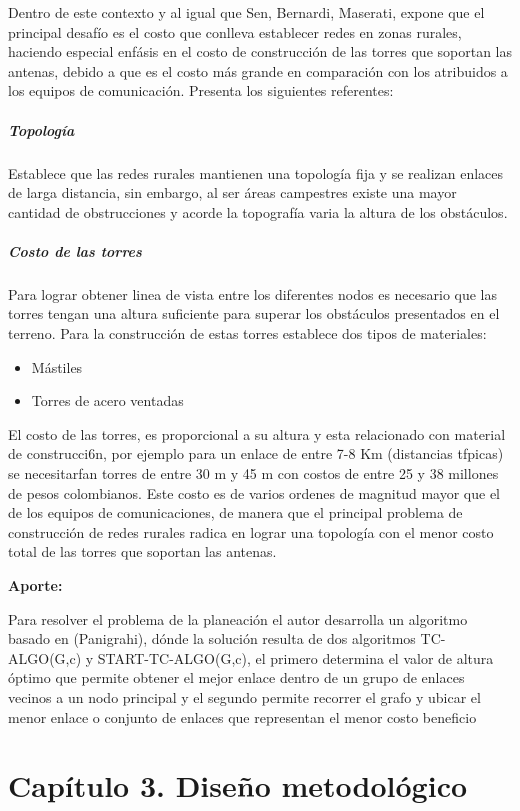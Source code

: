 \documentclass[]{article}
\providecommand{\tightlist}{%
  \setlength{\itemsep}{0pt}\setlength{\parskip}{0pt}}
\let\oldsubparagraph\subparagraph
\renewcommand{\subparagraph}[1]{\oldsubparagraph{#1}\mbox{}}
\begin{document}
Dentro de este contexto y al igual que Sen, Bernardi, Maserati, expone
que el principal desafío es el costo que conlleva establecer redes en
zonas rurales, haciendo especial enfásis en el costo de construcción de
las torres que soportan las antenas, debido a que es el costo más grande
en comparación con los atribuidos a los equipos de comunicación.
Presenta los siguientes referentes:

\subparagraph{Topología}\label{topologuxeda}

Establece que las redes rurales mantienen una topología fija y se
realizan enlaces de larga distancia, sin embargo, al ser áreas
campestres existe una mayor cantidad de obstrucciones y acorde la
topografía varia la altura de los obstáculos.

\subparagraph{Costo de las torres}\label{costo-de-las-torres}

Para lograr obtener linea de vista entre los diferentes nodos es
necesario que las torres tengan una altura suficiente para superar los
obstáculos presentados en el terreno. Para la construcción de estas
torres establece dos tipos de materiales:

\begin{itemize}
\tightlist
\item
  Mástiles
\item
  Torres de acero ventadas
\end{itemize}

El costo de las torres, es proporcional a su altura y esta re­lacionado
con material de construcci6n, por ejemplo para un enlace de entre 7-8 Km
(distancias tfpicas) se necesitarfan torres de entre 30 m y 45 m con
costos de entre 25 y 38 millones de pesos colombianos. Este costo es de
varios ordenes de magnitud mayor que el de los equipos de
comunicaciones, de manera que el principal problema de construcción de
redes rurales radica en lograr una topología con el menor costo total de
las torres que soportan las antenas.

\textbf{Aporte:}

Para resolver el problema de la planeación el autor desarrolla un
algoritmo basado en (Panigrahi), dónde la solución resulta de dos
algoritmos TC-ALGO(G,c) y START-TC-ALGO(G,c), el primero determina el
valor de altura óptimo que permite obtener el mejor enlace dentro de un
grupo de enlaces vecinos a un nodo principal y el segundo permite
recorrer el grafo y ubicar el menor enlace o conjunto de enlaces que
representan el menor costo beneficio

\section{Capítulo 3. Diseño
metodológico}\label{capuxedtulo-3.-diseuxf1o-metodoluxf3gico}
\end{document}
